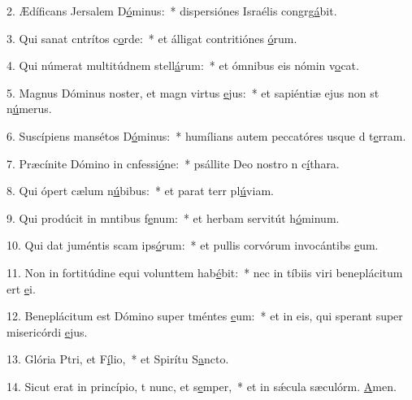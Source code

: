 2. Ædíficans Jersalem D\uline{ó}minus:~* dispersiónes Israélis congrg\uline{á}bit.\par 
3. Qui sanat cntrítos c\uline{o}rde:~* et álligat contritiónes \uline{ó}rum.\par 
4. Qui númerat multitúdnem stell\uline{á}rum:~* et ómnibus eis nómin v\uline{o}cat.\par 
5. Magnus Dóminus noster, et magn virtus \uline{e}jus:~* et sapiéntiæ ejus non st n\uline{ú}merus.\par 
6. Suscípiens mansétos D\uline{ó}minus:~* humílians autem peccatóres usque d t\uline{e}rram.\par 
7. Præcínite Dómino in cnfessi\uline{ó}ne:~* psállite Deo nostro n c\uline{í}thara.\par 
8. Qui ópert cælum n\uline{ú}bibus:~* et parat terr pl\uline{ú}viam.\par 
9. Qui prodúcit in mntibus f\uline{e}num:~* et herbam servitút h\uline{ó}minum.\par 
10. Qui dat juméntis scam ips\uline{ó}rum:~* et pullis corvórum invocántibs \uline{e}um.\par 
11. Non in fortitúdine equi volunttem hab\uline{é}bit:~* nec in tíbiis viri beneplácitum ert \uline{e}i.\par 
12. Beneplácitum est Dómino super tméntes \uline{e}um:~* et in eis, qui sperant super misericórdi \uline{e}jus.\par 
13. Glória Ptri, et F\uline{í}lio,~* et Spirítu S\uline{a}ncto.\par 
14. Sicut erat in princípio, t nunc, et s\uline{e}mper,~* et in sǽcula sæculórm. \uline{A}men.\par 
